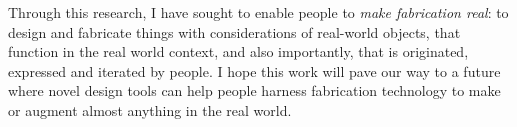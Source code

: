 




Through this research, I have sought to enable people to \textit{make fabrication real}: to design and fabricate things with considerations of real-world objects, that function in the real world context, and also importantly, that is originated, expressed and iterated by people. I hope this work will pave our way to a future where novel design tools can help people harness fabrication technology to make or augment almost anything in the real world.
